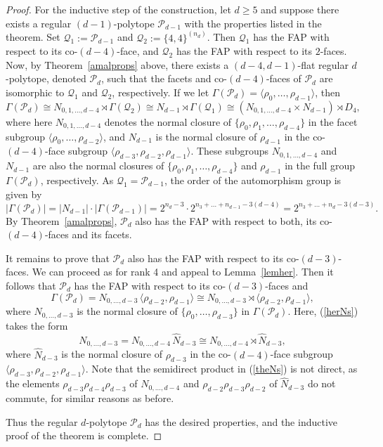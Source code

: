 \documentclass[12pt]{amsart}
\theoremstyle{definition}
\begin{document}
\begin{proof}
For the inductive step of the construction, let $d\geq 5$ and suppose there exists a regular $(d-1)$-polytope ${\mathcal P}_{d-1}$ with the properties listed in the theorem. Set ${\mathcal Q}_1:=\mathcal{P}_{d-1}$ and ${\mathcal Q}_2:=\{4,4\}^{(n_d)}$. Then ${\mathcal Q}_1$ has the FAP with respect to its co-$(d-4)$-face, and ${\mathcal Q}_2$ has the FAP with respect to its $2$-faces. Now, by Theorem~\ref{amalprops} above, there exists a $(d-4,d-1)$-flat regular $d$-polytope, denoted $\mathcal{P}_d$,  such that the facets and co-$(d-4)$-faces of ${\mathcal P}_d$ are isomorphic to ${\mathcal Q}_1$ and ${\mathcal Q}_2$, respectively. If we let $\Gamma({\mathcal P}_d)=\langle\rho_0,\ldots,\rho_{d-1}\rangle$, then 
\[\Gamma({\mathcal P}_d)
\cong N_{0,1,\ldots,d-4}\rtimes\Gamma(\mathcal{Q}_2)
\cong N_{d-1}\rtimes\Gamma(\mathcal{Q}_1)
\cong (N_{0,1,\ldots,d-4}\times N_{d-1})\rtimes D_4 ,\]
where here $N_{0,1,\ldots,d-4}$ denotes the normal closure of $\{\rho_0,\rho_1,\ldots,\rho_{d-4}\}$ in the facet subgroup $\langle\rho_0,\ldots,\rho_{d-2}\rangle$, and $N_{d-1}$ is the normal closure of $\rho_{d-1}$ in the co-$(d-4)$-face subgroup $\langle\rho_{d-3},\rho_{d-2},\rho_{d-1}\rangle$. These subgroups $N_{0,1,\ldots,d-4}$ and $N_{d-1}$ are also the normal closures of $\{\rho_0,\rho_1,\ldots,\rho_{d-4}\}$ and $\rho_{d-1}$ in the full group $\Gamma({\mathcal P}_d)$, respectively. As $\mathcal{Q}_{1}=\mathcal{P}_{d-1}$, the order of the automorphism group is given by 
\[|\Gamma({\mathcal P}_d)| = |N_{d-1}|\cdot |\Gamma(\mathcal{P}_{d-1})|
=2^{n_{d}-3}\cdot 2^{n_3+\ldots +n_{d-1} -3(d-4)} = 2^{n_3+\ldots +n_{d} -3(d-3)}.\]
By Theorem~\ref{amalprops}, ${\mathcal P}_d$ also has the FAP with respect to both, its co-$(d-4)$-faces and its facets.

It remains to prove that ${\mathcal P}_d$ also has the FAP with respect to its co-$(d-3)$-faces. We can proceed as for rank 4 and appeal to Lemma~\ref{lemher}. Then it follows that $\mathcal{P}_d$ has the FAP with respect to its co-$(d-3)$-faces and 
\[\Gamma({\mathcal P}_d) = N_{0,\ldots,d-3}\, \langle\rho_{d-2},\rho_{d-1}\rangle 
\cong N_{0,\ldots,d-3}\rtimes \langle\rho_{d-2},\rho_{d-1}\rangle,\]
where $N_{0,\ldots,d-3}$ is the normal closure of $\{\rho_0,\ldots,\rho_{d-3}\}$ in $\Gamma({\mathcal P}_d)$. Here, (\ref{herNs}) takes the form 
\begin{equation}
\label{theNs}
N_{0,\ldots,d-3}=N_{0,\ldots,d-4} \,\hat{N}_{d-3}\cong N_{0,\ldots,d-4} \rtimes \hat{N}_{d-3},
\end{equation}
where $\hat{N}_{d-3}$ is the normal closure of $\rho_{d-3}$ in the co-$(d-4)$-face subgroup $\langle\rho_{d-3},\rho_{d-2},\rho_{d-1}\rangle$.
Note that the semidirect product in (\ref{theNs}) is not direct, as the elements $\rho_{d-3}\rho_{d-4}\rho_{d-3}$ of $N_{0,\ldots,d-4}$ and $\rho_{d-2}\rho_{d-3}\rho_{d-2}$ of $\hat{N}_{d-3}$ do not commute, for similar reasons as before.

Thus the regular $d$-polytope ${\mathcal P}_d$ has the desired properties, and the inductive proof of the theorem is complete.
\end{proof}
\smallskip
\end{document}
